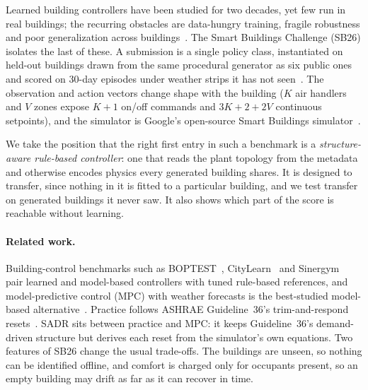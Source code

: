 \documentclass{article}
\begin{document}
Learned building controllers have been studied for two decades, yet few run in real buildings; the recurring obstacles are data-hungry training, fragile robustness and poor generalization across buildings~\citep{wang2020rl}. The Smart Buildings Challenge (SB26) isolates the last of these. A submission is a single policy class, instantiated on held-out buildings drawn from the same procedural generator as six public ones and scored on 30-day episodes under weather strips it has not seen~\citep{sb26kit}. The observation and action vectors change shape with the building ($K$ air handlers and $V$ zones expose $K{+}1$ on/off commands and $3K{+}2{+}2V$ continuous setpoints), and the simulator is Google's open-source Smart Buildings simulator~\citep{goldfeder2023lightweight,goldfeder2025suite}.

We take the position that the right first entry in such a benchmark is a \emph{structure-aware rule-based controller}: one that reads the plant topology from the metadata and otherwise encodes physics every generated building shares. It is designed to transfer, since nothing in it is fitted to a particular building, and we test transfer on generated buildings it never saw. It also shows which part of the score is reachable without learning.

\paragraph{Related work.} Building-control benchmarks such as BOPTEST~\citep{blum2021boptest}, CityLearn~\citep{vazquezcanteli2019citylearn} and Sinergym~\citep{jimenezraboso2021sinergym} pair learned and model-based controllers with tuned rule-based references, and model-predictive control (MPC) with weather forecasts is the best-studied model-based alternative~\citep{oldewurtel2012mpc,drgona2020mpc}. Practice follows ASHRAE Guideline~36's trim-and-respond resets~\citep{ashrae2021g36,taylor2018vav}. SADR sits between practice and MPC: it keeps Guideline~36's demand-driven structure but derives each reset from the simulator's own equations. Two features of SB26 change the usual trade-offs. The buildings are unseen, so nothing can be identified offline, and comfort is charged only for occupants present, so an empty building may drift as far as it can recover in time.
\end{document}
